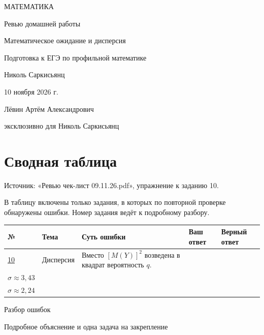 \documentclass[a4paper,12pt]{article}
\begin{document}
\thispagestyle{empty}
\begin{center}
\vspace*{28mm}
{\color{darkaccent}\large МАТЕМАТИКА}\par\vspace{15mm}
{\Huge Ревью домашней работы}\par\vspace{11mm}
{\fontsize{17}{23}\selectfont\color{accent}Математическое ожидание и дисперсия}\par\vspace{15mm}
{\small Подготовка к ЕГЭ по профильной математике}\par
\vfill
{\normalsize Николь Саркисьянц}\par\vspace{8mm}
{\normalsize 10 ноября 2026 г.}\par\vspace{12mm}
{\small Лёвин Артём Александрович}\par
{\small эксклюзивно для Николь Саркисьянц}\par\vspace{12mm}
\end{center}
\clearpage
\section*{Сводная таблица}
\textcolor{darkaccent}{Источник:} «Ревью чек-лист 09.11.26.pdf», упражнение к заданию 10.

В таблицу включены только задания, в которых по повторной проверке обнаружены ошибки. Номер задания ведёт к подробному разбору.
\par\par\vspace{4mm}
\small\renewcommand{\arraystretch}{1.35}
\begin{tabularx}{\linewidth}{@{}p{12mm}p{27mm}X p{32mm}p{35mm}@{}}
\toprule
\textbf{№} & \textbf{Тема} & \textbf{Суть ошибки} & \textbf{Ваш ответ} & \textbf{Верный ответ}\\\midrule
\hyperref[task:10]{10} & Дисперсия & Вместо $[M(Y)]^2$ возведена в квадрат вероятность $q$. & \shortstack[l]{$D=11{,}76$\\$\sigma\approx3{,}43$} & \shortstack[l]{$D=5{,}04$\\$\sigma\approx2{,}24$}\\
\bottomrule
\end{tabularx}
\normalsize
\clearpage
\thispagestyle{empty}
\vspace*{\fill}
\begin{center}{\fontsize{25}{30}\selectfont\color{darkaccent}Разбор ошибок}\par\vspace{5mm}
{\large Подробное объяснение и одна задача на закрепление}\end{center}
\vspace*{\fill}
\clearpage
{}\label{task:10}
\end{document}
